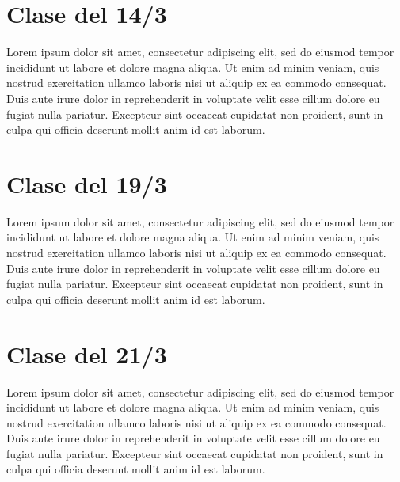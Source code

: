 \documentclass{article}
\begin{document}
\section*{Clase del 14/3}
Lorem ipsum dolor sit amet, consectetur adipiscing elit, sed do eiusmod tempor incididunt ut labore et dolore magna aliqua. Ut enim ad minim veniam, quis nostrud exercitation ullamco laboris nisi ut aliquip ex ea commodo consequat. Duis aute irure dolor in reprehenderit in voluptate velit esse cillum dolore eu fugiat nulla pariatur. Excepteur sint occaecat cupidatat non proident, sunt in culpa qui officia deserunt mollit anim id est laborum.
\newpage

\section*{Clase del 19/3}
Lorem ipsum dolor sit amet, consectetur adipiscing elit, sed do eiusmod tempor incididunt ut labore et dolore magna aliqua. Ut enim ad minim veniam, quis nostrud exercitation ullamco laboris nisi ut aliquip ex ea commodo consequat. Duis aute irure dolor in reprehenderit in voluptate velit esse cillum dolore eu fugiat nulla pariatur. Excepteur sint occaecat cupidatat non proident, sunt in culpa qui officia deserunt mollit anim id est laborum.
\newpage

\section*{Clase del 21/3}
Lorem ipsum dolor sit amet, consectetur adipiscing elit, sed do eiusmod tempor incididunt ut labore et dolore magna aliqua. Ut enim ad minim veniam, quis nostrud exercitation ullamco laboris nisi ut aliquip ex ea commodo consequat. Duis aute irure dolor in reprehenderit in voluptate velit esse cillum dolore eu fugiat nulla pariatur. Excepteur sint occaecat cupidatat non proident, sunt in culpa qui officia deserunt mollit anim id est laborum.
\end{document}
